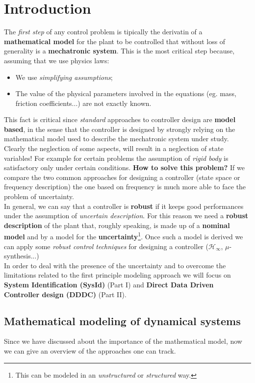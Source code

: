 \chapter{Introduction}

The \textit{first step} of any control problem is tipically the derivatin of a \textbf{mathematical model} for the plant to be controlled that without loss of generality is a \textbf{mechatronic system}. This is the most critical step because, assuming that we use physics laws:
\begin{itemize}
    \itemsep-0.1em
    \item We use \textit{simplifying assumptions}; 
    \item The value of the physical parameters involved in the equations (eg. mass, friction coefficients...) are not exactly known.
\end{itemize}
This fact is critical since \textit{standard} approaches to controller design are \textbf{model based}, in the sense that the controller is designed by strongly relying on the mathematical model used to describe the mechatronic system under study. Clearly the neglection of some aspects, will result in a neglection of state variables! For example for certain problems the assumption of \textit{rigid body} is satisfactory only under certain conditions.
\textbf{How to solve this problem?} If we compare the two common approaches for designing a controller (state space or  frequency description) the one based on frequency is much more able to face the problem of uncertainty.\\
In general, we can say that a controller is \textbf{robust} if it keeps good performances under the assumption of \textit{uncertain description}. For this reason we need a \textbf{robust description} of the plant that, roughly speaking, is made up of a \textbf{nominal model} and by a model for the \textbf{uncertainty}{\footnote{
    This can be modeled in an \textit{unstructured} or \textit{structured} way.
}}. Once such a model is derived we can apply some \textit{robust control techniques} for designing a controller  ($\mathcal{H}_{\infty}$, $\mu$-synthesis...)\\

In order to deal with the presence of the uncertainty and to overcome the limitations related to the first principle modeling approach we will focus on \textbf{System Identification (SysId)} (Part I)  and \textbf{Direct Data Driven Controller design (DDDC)} (Part II).

\section{Mathematical modeling of dynamical systems}
Since we have discussed about the importance of the mathematical model, now we can give an overview of the approaches one can track. 
